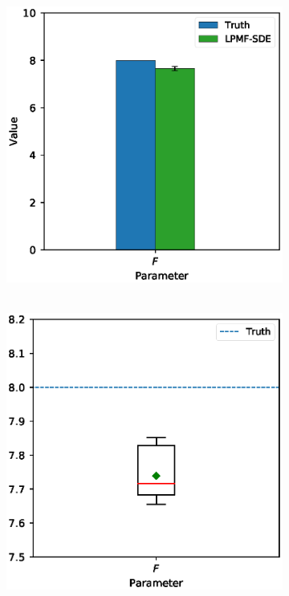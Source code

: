 \begin{figure}
    \centering
    \begin{subfigure}[b]{0.48\textwidth}
        \includegraphics[width=\linewidth]{graphics/lorenz-96-parameters}
        \caption{\ }
        \label{fig-lorenz-96-parameters}
    \end{subfigure}
    \begin{subfigure}[b]{0.48\textwidth}
        \includegraphics[width=\linewidth]{graphics/lorenz-96-parameters-boxplot}

\end{subfigure}
\end{figure}
